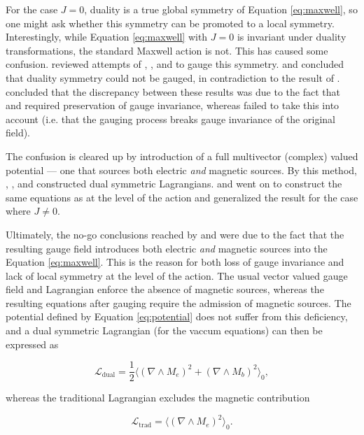 \documentclass{article}
\begin{document}
  For the case $J=0$, duality is a true global symmetry of Equation \ref{eq:maxwell}, so one might ask whether this symmetry can be promoted to a local symmetry. Interestingly, while Equation \ref{eq:maxwell} with $J=0$ is invariant under duality transformations, the standard Maxwell action is not. This has caused some confusion. \cite{saa} reviewed attempts of \cite{malik}, \cite{bunster}, and \cite{deser} to gauge this symmetry. \cite{bunster} and \cite{deser} concluded that duality symmetry could not be gauged, in contradiction to the result of \cite{malik}. \cite{saa} concluded that the discrepancy between these results was due to the fact that \cite{bunster} and \cite{deser} required preservation of gauge invariance, whereas \cite{malik} failed to take this into account (i.e. that the gauging process breaks gauge invariance of the original field).

  The confusion is cleared up by introduction of a full multivector (complex) valued potential --- one that sources both electric \emph{and} magnetic sources. By this method, \cite{dressel}, \cite{tiwari}, and \cite{vasconcellos}  constructed dual symmetric Lagrangians. \cite{tiwari} and \cite{vasconcellos} went on to construct the same equations as \cite{malik} at the level of the action and generalized the result for the case where $J \not= 0$. 

  Ultimately, the no-go conclusions reached by \cite{bunster} and \cite{deser} were due to the fact that the resulting gauge field introduces both electric \emph{and} magnetic sources into the Equation \ref{eq:maxwell}. This is the reason for both loss of gauge invariance and lack of local symmetry at the level of the action. The usual vector valued gauge field and Lagrangian enforce the absence of magnetic sources, whereas the resulting equations after gauging require the admission of magnetic sources. The potential defined by Equation \ref{eq:potential} does not suffer from this deficiency, and a dual symmetric Lagrangian (for the vaccum equations) can then be expressed as\cite{dressel}

  \begin{equation}
    \mathcal{L}_{\text{dual}} = \frac{1}{2}\langle (\nabla \wedge M_e)^2 + (\nabla \wedge M_b)^2 \rangle_0,
  \end{equation}

  whereas the traditional Lagrangian excludes the magnetic contribution

  \begin{equation}
    \mathcal{L}_\text{trad} = \langle (\nabla \wedge M_e)^2 \rangle_0.
  \end{equation}
\end{document}
